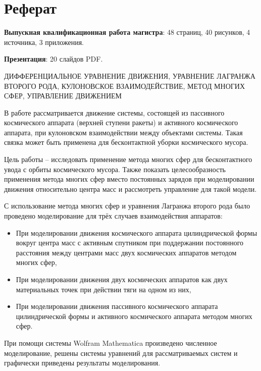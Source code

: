 \section*{Реферат}
\textbf{Выпускная квалификационная работа магистра}: 48 страниц, 40 рисунков, 4 источника, 3 приложения. 

\textbf{Презентация}: 20 слайдов PDF.

\hspace{1pt}

ДИФФЕРЕНЦИАЛЬНОЕ УРАВНЕНИЕ ДВИЖЕНИЯ, УРАВНЕНИЕ ЛАГРАНЖА ВТОРОГО РОДА, КУЛОНОВСКОЕ ВЗАИМОДЕЙСТВИЕ, МЕТОД МНОГИХ СФЕР, УПРАВЛЕНИЕ ДВИЖЕНИЕМ

\hspace{1pt}

В работе рассматривается движение системы, состоящей из пассивного космического аппарата (верхней ступени ракеты) и активного космического аппарата, при кулоновском взаимодействии между объектами системы.
Такая связка может быть применена для бесконтактной уборки космического мусора.

Цель работы – исследовать применение метода многих сфер  для бесконтактного увода с орбиты космического мусора.
Также показать целесообразность применения метода многих сфер вместо постоянных зарядов при моделировании движения относительно центра масс и рассмотреть управление для такой модели.

С использование метода многих сфер и уравнения Лагранжа второго рода было проведено моделирование для трёх случаев взаимодействия аппаратов:
\begin{itemize}
	\item При моделировании движения космического аппарата цилиндрической формы вокруг центра масс с активным спутником при поддержании постоянного расстояния между центрами масс двух космических аппаратов методом многих сфер,
	\item При моделировании движения двух космических аппаратов как двух материальных точек при действии тяги на одном из них,
	\item При моделировании движения пассивного космического аппарата цилиндрической формы и активного космического аппарата методом многих сфер.
\end{itemize}
При помощи системы Wolfram Mathematica произведено численное моделирование, решены системы уравнений для рассматриваемых систем и графически приведены результаты моделирования.